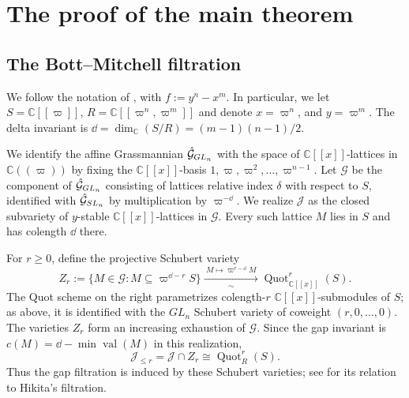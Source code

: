 \documentclass[a4paper,11pt,leqno]{amsart}
\newcommand{\C}{\mathbb C}\newcommand{\J}{\mathcal J}
\begin{document}
\section{The proof of the main theorem}
\subsection{The Bott--Mitchell filtration}
We follow the notation of \cite[\S1 and \S7--\S8]{KTpublished}, with
$f:=y^n-x^m$. In particular, we let $S=\C[[\varpi]]$, $R=\C[[\varpi^n, \varpi^m]]$ and denote $x=\varpi^n$, and $y=\varpi^m$.
The delta invariant is $\dd=\dim_\C(S/R)=(m-1)(n-1)/2$.

We identify the affine Grassmannian $\hat{\mathcal{G}}_{GL_n}$ with the space of $\C[[x]]$-lattices in $\C((\varpi))$ by fixing the $\C[[x]]$-basis $1,\varpi,\varpi^2,\ldots,\varpi^{n-1}$. 
Let $\mathcal G$ be the component of $\hat{\mathcal{G}}_{GL_n}$ consisting of lattices relative index $\delta$ with respect to $S$, 
identified with $\hat{\mathcal{G}}_{SL_n}$
by multiplication by $\varpi^{-\dd}$. We realize $\J$ as the closed
subvariety of $y$-stable $\C[[x]]$-lattices in $\mathcal G$.
Every such lattice $M$ lies in $S$ and has colength $\dd$ there.

For $r\ge0$, define the projective Schubert variety
\begin{equation}\label{eq:gap-quot}
 Z_r:=\{M\in\mathcal G:M\subseteq\varpi^{\dd-r}S\}
 \xrightarrow[\sim]{\ M\mapsto\varpi^{r-\dd}M\ }
 \operatorname{Quot}^{r}_{\C[[x]]}(S).
\end{equation}
The Quot scheme on the right parametrizes colength-$r$
$\C[[x]]$-submodules of $S$; as above, it is identified with the $GL_n$ Schubert variety of
coweight $(r,0,\ldots,0)$. The varieties $Z_r$ form an increasing
exhaustion of $\mathcal G$. Since the gap invariant is
$c(M)=\dd-\min\operatorname{val}(M)$ in this realization,
\[
 \J_{\le r}=\J\cap Z_r
 \cong\operatorname{Quot}^{r}_R(S).
\]
Thus the gap filtration is induced by these Schubert varieties; see
\cite[Lemma 8.1 and Theorem 8.3]{KTpublished} for its relation to Hikita's filtration.
\end{document}
